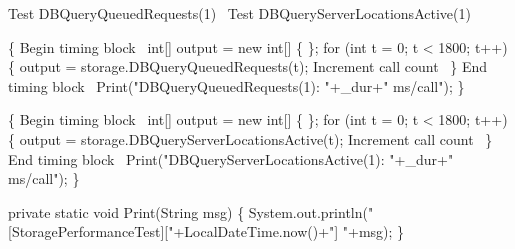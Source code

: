\documentclass{article}
\def\nwendcode{\endtrivlist \endgroup}
\let\nwdocspar=\par
\begin{document}
\nwenddocs{}\endmoddef{}
\LA{}Test \code{}DBQueryQueuedRequests\edoc{}(1)~{\nwtagstyle{}}\RA{}
\LA{}Test \code{}DBQueryServerLocationsActive\edoc{}(1)~{\nwtagstyle{}}\RA{}
\nwendcode{}\nwdocspar

\nwenddocs{}\endmoddef{}
\{
  \LA{}Begin timing block~{\nwtagstyle{}}\RA{}
  int[] output = new int[] \{ \};
  for (int t = 0; t < 1800; t++) \{
    output = storage.DBQueryQueuedRequests(t);
    \LA{}Increment call count~{\nwtagstyle{}}\RA{}
  \}
  \LA{}End timing block~{\nwtagstyle{}}\RA{}
  Print("DBQueryQueuedRequests(1): "+_dur+" ms/call");
\}
\nwendcode{}\nwdocspar

\nwenddocs{}\endmoddef{}
\{
  \LA{}Begin timing block~{\nwtagstyle{}}\RA{}
  int[] output = new int[] \{ \};
  for (int t = 0; t < 1800; t++) \{
    output = storage.DBQueryServerLocationsActive(t);
    \LA{}Increment call count~{\nwtagstyle{}}\RA{}
  \}
  \LA{}End timing block~{\nwtagstyle{}}\RA{}
  Print("DBQueryServerLocationsActive(1): "+_dur+" ms/call");
\}
\nwendcode{}\nwdocspar

\nwenddocs{}\endmoddef{}
private static void Print(String msg) \{
  System.out.println("[StoragePerformanceTest]["+LocalDateTime.now()+"] "+msg);
\}
\nwendcode{}
\end{document}
